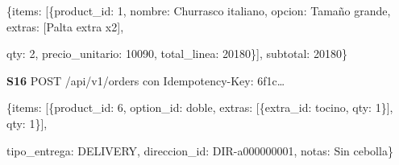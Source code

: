 \documentclass[10pt,letterpaper]{article}
\begin{document}
{\footnotesize\ttfamily\raggedright\setlength{\parskip}{0pt}
\{\textquotedbl{}items\textquotedbl{}: [\{\textquotedbl{}product\_\allowbreak{}id\textquotedbl{}: 1, \textquotedbl{}nombre\textquotedbl{}: \textquotedbl{}Churrasco italiano\textquotedbl{}, \textquotedbl{}opcion\textquotedbl{}: \textquotedbl{}Tamaño grande\textquotedbl{}, \textquotedbl{}extras\textquotedbl{}: [\textquotedbl{}Palta extra x2\textquotedbl{}],\par
\textquotedbl{}qty\textquotedbl{}: 2, \textquotedbl{}precio\_\allowbreak{}unitario\textquotedbl{}: 10090, \textquotedbl{}total\_\allowbreak{}linea\textquotedbl{}: 20180\}], \textquotedbl{}subtotal\textquotedbl{}: 20180\}\par}

\textbf{S16} POST /\allowbreak{}api/\allowbreak{}v1/\allowbreak{}orders con Idempotency-Key: 6f1c…

{\footnotesize\ttfamily\raggedright\setlength{\parskip}{0pt}
\{\textquotedbl{}items\textquotedbl{}: [\{\textquotedbl{}product\_\allowbreak{}id\textquotedbl{}: 6, \textquotedbl{}option\_\allowbreak{}id\textquotedbl{}: \textquotedbl{}doble\textquotedbl{}, \textquotedbl{}extras\textquotedbl{}: [\{\textquotedbl{}extra\_\allowbreak{}id\textquotedbl{}: \textquotedbl{}tocino\textquotedbl{}, \textquotedbl{}qty\textquotedbl{}: 1\}], \textquotedbl{}qty\textquotedbl{}: 1\}],\par
\textquotedbl{}tipo\_\allowbreak{}entrega\textquotedbl{}: \textquotedbl{}DELIVERY\textquotedbl{}, \textquotedbl{}direccion\_\allowbreak{}id\textquotedbl{}: \textquotedbl{}DIR-a000000001\textquotedbl{}, \textquotedbl{}notas\textquotedbl{}: \textquotedbl{}Sin cebolla\textquotedbl{}\}\par}
\end{document}
